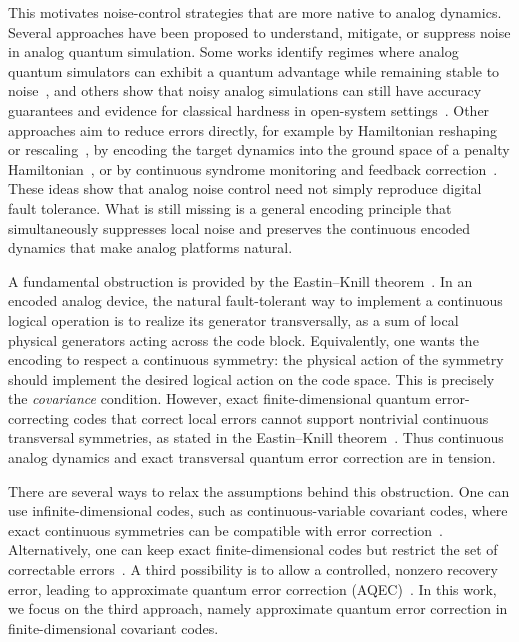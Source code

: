\documentclass[10pt,twocolumn,superscriptaddress,aps,amsmath,amssymb,citeautoscript,floatfix,prx,longbibliography]{revtex4-2}
\theoremstyle{plain}
\theoremstyle{plain}
\theoremstyle{plain}
\theoremstyle{plain}
\theoremstyle{plain}
\theoremstyle{plain}
\begin{document}
This motivates noise-control strategies that are more native to analog dynamics. Several approaches have been proposed to understand, mitigate, or suppress noise in analog quantum simulation. Some works identify regimes where analog quantum simulators can exhibit a quantum advantage while remaining stable to noise~\cite{Trivedi2024AnalogStability}, and others show that noisy analog simulations can still have accuracy guarantees and evidence for classical hardness in open-system settings~\cite{Kashyap2025AnalogOpenSimulation}. Other approaches aim to reduce errors directly, for example by Hamiltonian reshaping or rescaling~\cite{Guo2025HamiltonianReshaping}, by encoding the target dynamics into the ground space of a penalty Hamiltonian~\cite{Cao2024RobustAnalog}, or by continuous syndrome monitoring and feedback correction~\cite{Atalaya2021ContinuousQEC}. These ideas show that analog noise control need not simply reproduce digital fault tolerance. What is still missing is a general encoding principle that simultaneously suppresses local noise and preserves the continuous encoded dynamics that make analog platforms natural.

A fundamental obstruction is provided by the Eastin--Knill theorem~\cite{Eastin2009}. In an encoded analog device, the natural fault-tolerant way to implement a continuous logical operation is to realize its generator transversally, as a sum of local physical generators acting across the code block. Equivalently, one wants the encoding to respect a continuous symmetry: the physical action of the symmetry should implement the desired logical action on the code space. This is precisely the \textit{covariance} condition. However, exact finite-dimensional quantum error-correcting codes that correct local errors cannot support nontrivial continuous transversal symmetries, as stated in the Eastin--Knill theorem~\cite{Eastin2009}. Thus continuous analog dynamics and exact transversal quantum error correction are in tension.

There are several ways to relax the assumptions behind this obstruction. One can use infinite-dimensional codes, such as continuous-variable covariant codes, where exact continuous symmetries can be compatible with error correction~\cite{Hayden2021}. Alternatively, one can keep exact finite-dimensional codes but restrict the set of correctable errors~\cite{Gupta2024}. A third possibility is to allow a controlled, nonzero recovery error, leading to approximate quantum error correction (AQEC)~\cite{Beny2010}. In this work, we focus on the third approach, namely approximate quantum error correction in finite-dimensional covariant codes.
\end{document}
